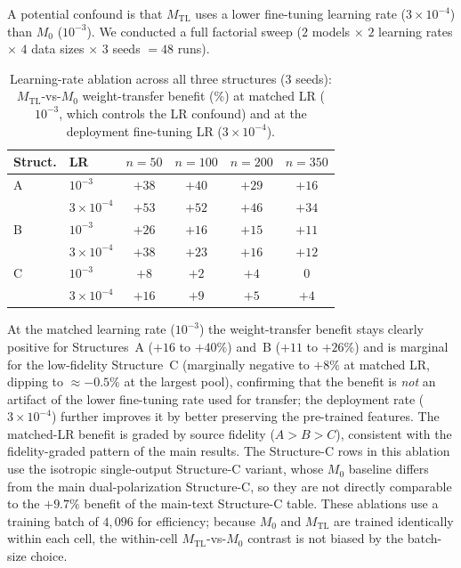 \documentclass[11pt]{article}
\newcommand{\Mzero}{\ensuremath{M_0}}
\newcommand{\Mtl}{\ensuremath{M_\text{TL}}}
\begin{document}
A potential confound is that $\Mtl$ uses a lower fine-tuning learning rate ($3 \times 10^{-4}$) than $\Mzero$ ($10^{-3}$). We conducted a full factorial sweep ($2$ models $\times$ $2$ learning rates $\times$ $4$ data sizes $\times$ $3$ seeds $= 48$ runs).

\begin{table}[htbp]\centering\small
\caption{Learning-rate ablation across all three structures (3 seeds): $\Mtl$-vs-$\Mzero$ weight-transfer benefit (\%) at matched LR ($10^{-3}$, which controls the LR confound) and at the deployment fine-tuning LR ($3{\times}10^{-4}$).}
\label{tab:lr_ablation}
\begin{tabular}{ll cccc}\toprule
\textbf{Struct.} & \textbf{LR} & $n{=}50$ & $n{=}100$ & $n{=}200$ & $n{=}350$\\\midrule
A & $10^{-3}$          & $+38$ & $+40$ & $+29$ & $+16$\\
  & $3{\times}10^{-4}$ & $+53$ & $+52$ & $+46$ & $+34$\\\midrule
B & $10^{-3}$          & $+26$ & $+16$ & $+15$ & $+11$\\
  & $3{\times}10^{-4}$ & $+38$ & $+23$ & $+16$ & $+12$\\\midrule
C & $10^{-3}$          & $+8$  & $+2$  & $+4$  & $0$\\
      & $3{\times}10^{-4}$ & $+16$ & $+9$  & $+5$  & $+4$\\\bottomrule
\end{tabular}
\end{table}

At the matched learning rate ($10^{-3}$) the weight-transfer benefit stays clearly positive for Structures~A ($+16$ to $+40\%$) and~B ($+11$ to $+26\%$) and is marginal for the low-fidelity Structure~C (marginally negative to $+8\%$ at matched LR, dipping to ${\approx}-0.5\%$ at the largest pool), confirming that the benefit is \emph{not} an artifact of the lower fine-tuning rate used for transfer; the deployment rate ($3{\times}10^{-4}$) further improves it by better preserving the pre-trained features. The matched-LR benefit is graded by source fidelity ($A>B>C$), consistent with the fidelity-graded pattern of the main results. The Structure-C rows in this ablation use the isotropic single-output Structure-C variant, whose $\Mzero$ baseline differs from the main dual-polarization Structure-C, so they are not directly comparable to the $+9.7\%$ benefit of the main-text Structure-C table. These ablations use a training batch of $4{,}096$ for efficiency; because $\Mzero$ and $\Mtl$ are trained identically within each cell, the within-cell $\Mtl$-vs-$\Mzero$ contrast is not biased by the batch-size choice.
\end{document}
